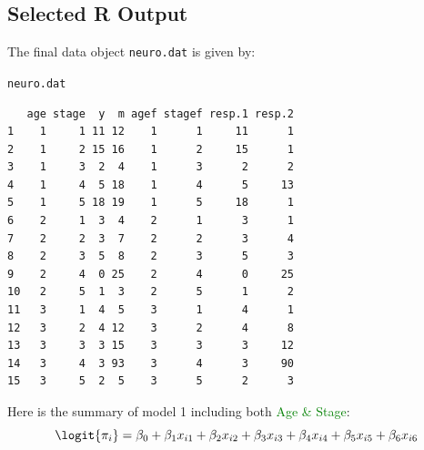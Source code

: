 \documentclass[oneside]{book}\usepackage[]{graphicx}\usepackage[svgnames]{xcolor}
\makeatletter
\newcommand{\hlstd}[1]{\textcolor[rgb]{0.345,0.345,0.345}{#1}}%
\newenvironment{kframe}{%
 \def\at@end@of@kframe{}%
 \ifinner\ifhmode%
  \def\at@end@of@kframe{\end{minipage}}%
  \begin{minipage}{\columnwidth}%
 \fi\fi%
 \def\FrameCommand##1{\hskip\@totalleftmargin \hskip-\fboxsep
 \colorbox{shadecolor}{##1}\hskip-\fboxsep
     \hskip-\linewidth \hskip-\@totalleftmargin \hskip\columnwidth}%
 \MakeFramed {\advance\hsize-\width
   \@totalleftmargin\z@ \linewidth\hsize
   \@setminipage}}%
 {\par\unskip\endMakeFramed%
 \at@end@of@kframe}
\newenvironment{knitrout}{}{} %
\makeatother
\begin{document}
\subsection*{Selected R Output}
The final data object \texttt{neuro.dat} is given by:
\begin{knitrout}
\color{fgcolor}\begin{kframe}
\begin{alltt}
\hlstd{neuro.dat}
\end{alltt}
\begin{verbatim}
   age stage  y  m agef stagef resp.1 resp.2
1    1     1 11 12    1      1     11      1
2    1     2 15 16    1      2     15      1
3    1     3  2  4    1      3      2      2
4    1     4  5 18    1      4      5     13
5    1     5 18 19    1      5     18      1
6    2     1  3  4    2      1      3      1
7    2     2  3  7    2      2      3      4
8    2     3  5  8    2      3      5      3
9    2     4  0 25    2      4      0     25
10   2     5  1  3    2      5      1      2
11   3     1  4  5    3      1      4      1
12   3     2  4 12    3      2      4      8
13   3     3  3 15    3      3      3     12
14   3     4  3 93    3      4      3     90
15   3     5  2  5    3      5      2      3
\end{verbatim}
\end{kframe}
\end{knitrout}
Here is the summary of model 1 including both \textcolor{Green}{Age \& Stage}:
\[ \logit{\pi_i}=\beta_0+\beta_1x_{i1}+\beta_2x_{i2}+\beta_3x_{i3}+\beta_4x_{i4}+\beta_5x_{i5}+\beta_6x_{i6} \]
\end{document}
